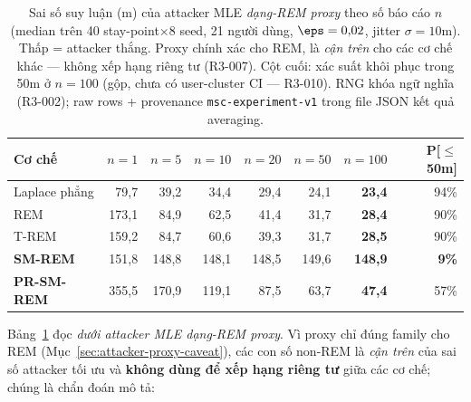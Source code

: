 \begin{table}[ht]
\centering
\caption[Sai số averaging đa-stay-point theo số báo cáo (attacker proxy)]{Sai số suy luận (m) của attacker MLE \emph{dạng-REM proxy} theo số báo
cáo $n$ (median trên 40 stay-point$\times$8 seed, 21 người dùng, $\eps=0{,}02$,
jitter $\sigma=10$m). Thấp = attacker thắng. Proxy chính xác cho REM, là
\emph{cận trên} cho các cơ chế khác --- không xếp hạng riêng tư (R3-007). Cột
cuối: xác suất khôi phục trong 50m ở $n{=}100$ (gộp, chưa có user-cluster CI ---
R3-010). RNG khóa ngữ nghĩa (R3-002); raw rows + provenance
\texttt{msc-experiment-v1} trong file JSON kết quả averaging.}
\label{tab:averaging-multi}
\small
\setlength{\tabcolsep}{4.5pt}
\begin{tabular}{lrrrrrr r}
\toprule
Cơ chế & $n{=}1$ & $n{=}5$ & $n{=}10$ & $n{=}20$ & $n{=}50$ & $n{=}100$ & P[$\le$50m] \\
\midrule
Laplace phẳng & 79,7 & 39,2 & 34,4 & 29,4 & 24,1 & \textbf{23,4} & 94\% \\
REM           & 173,1 & 84,9 & 62,5 & 41,4 & 31,7 & \textbf{28,4} & 90\% \\
T-REM         & 159,2 & 84,7 & 60,6 & 39,3 & 31,7 & \textbf{28,5} & 90\% \\
\textbf{SM-REM}   & 151,8 & 148,8 & 148,1 & 148,5 & 149,6 & \textbf{148,9} & \textbf{9\%} \\
\textbf{PR-SM-REM} & 355,5 & 170,9 & 119,1 & 87,5 & 63,7 & \textbf{47,4} & 57\% \\
\bottomrule
\end{tabular}
\end{table}

Bảng~\ref{tab:averaging-multi} đọc \emph{dưới attacker MLE dạng-REM proxy}. Vì
proxy chỉ đúng family cho REM (Mục~\ref{sec:attacker-proxy-caveat}), các con số
non-REM là \emph{cận trên} của sai số attacker tối ưu và \textbf{không dùng để
xếp hạng riêng tư} giữa các cơ chế; chúng là chẩn đoán mô tả:

